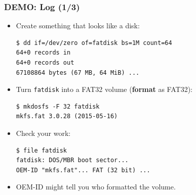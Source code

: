 \begin{frame}[fragile]

\frametitle{DEMO: Log (1/3)}

\begin{itemize}

\item Create something that looks like a disk:

\begin{verbatim}
$ dd if=/dev/zero of=fatdisk bs=1M count=64
64+0 records in
64+0 records out
67108864 bytes (67 MB, 64 MiB) ...
\end{verbatim}

\item Turn \texttt{fatdisk} into a FAT32 volume (\textbf{format} as FAT32):

\begin{verbatim}
$ mkdosfs -F 32 fatdisk
mkfs.fat 3.0.28 (2015-05-16)
\end{verbatim}

\item Check your work:

\begin{verbatim}
$ file fatdisk 
fatdisk: DOS/MBR boot sector...
OEM-ID "mkfs.fat"... FAT (32 bit) ...
\end{verbatim}

\item OEM-ID might tell you who formatted the volume.

\end{itemize}

\end{frame}


